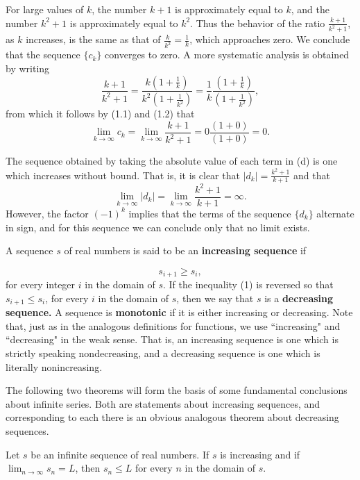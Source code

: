 \begin{example}
For large values of $k$, the number $k + 1$ is approximately equal to $k$, and the number $k^2 + 1$ is approximately equal to $k^2$. Thus the behavior of the ratio $\frac{k + 1}{k^2 + 1}$, as $k$ increases, is the same as that of $\frac{k}{k^2} = \frac{1}{k}$, which approaches zero. We conclude that the sequence $\{c_k\}$ converges to zero. A more systematic analysis is obtained by writing
$$
\frac{k + 1}{k^2 + 1} = \frac{k (1 + \frac{1}{k})}{k^2 (1 + \frac{1}{k^2})} 
= \frac{1}{k} \frac{(1 + \frac{1}{k})}{(1 + \frac{1}{k^2})} ,
$$
from which it follows by (1.1) and (1.2) that
$$
\lim_{k \rightarrow \infty} c_k = \lim_{k \rightarrow \infty} \frac{k + 1}{k^2+ 1} = 0 \frac{(1 + 0)}{(1 + 0)} = 0.
$$

The sequence obtained by taking the absolute value of each term in (d)
is one which increases without bound. That is, it is clear that $|d_k| = \frac{k^2+ 1}{k + 1}$ and that 
$$
\lim_{k \rightarrow \infty} |d_k| = \lim_{k \rightarrow \infty} \frac{k^2+ 1}{k + 1} = \infty.
$$ 
However, the factor $(-1)^k$ implies that the terms of the sequence $\{d_k \}$ alternate in sign, and for this sequence we can conclude only that no limit exists.
\end{example}

A sequence $s$ of real numbers is said to be an \textbf{increasing sequence} if

\begin{equation}
s_{i+1} \geq s_i,  
\label{eq9.1.1}
\end{equation}
\noindent for every integer $i$ in the domain of $s$. If the inequality (1) is reversed so that $s_{i+1} \leq s_i$, for every $i$ in the domain of $s$, then we say that $s$ is a \textbf{decreasing sequence.} A sequence is \textbf{monotonic} if it is either increasing or decreasing. Note that, just as in the analogous definitions for functions, we use ``increasing" and ``decreasing" in the weak sense. That is, an increasing sequence is one which is strictly speaking nondecreasing, and a decreasing sequence is one which is literally nonincreasing.

The following two theorems will form the basis of some fundamental conclusions about infinite series. Both are statements about increasing sequences, and corresponding to each there is an obvious analogous theorem about decreasing sequences.

\begin{theorem} %
Let $s$ be an infinite sequence of real numbers. If $s$ is increasing and if $\lim_{n \rightarrow \infty} s_n  = L$, then $s_n \leq L$ for every $n$ in the domain of $s$.
\end{theorem}

